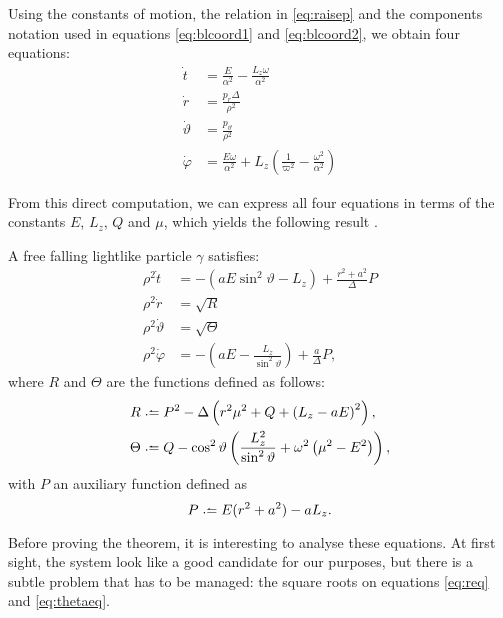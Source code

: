 Using the constants of motion, the relation in \autoref{eq:raisep} and the components notation used in equations \ref{eq:blcoord1} and  \ref{eq:blcoord2}, we obtain four equations:
\begin{align}
	\label{eq:initt}
	\dot{t} &= \frac{E}{\alpha^2} - \frac{L_z \omega}{\alpha^2} \\
	\label{eq:initr}
	\dot{r} &= \frac{p_r \Delta}{\rho^2} \\
	\label{eq:inittheta}
	\dot{\vartheta} &= \frac{p_\vartheta}{\rho^2} \\
	\label{eq:initphi}
	\dot{\varphi} &= \frac{E \omega}{\alpha^2} + L_z\left( \frac{1}{\varpi^2} - \frac{\omega^2}{\alpha^2} \right)
\end{align}

From this direct computation, we can express all four equations in terms of the constants $E$, $L_z$, $Q$ and $\mu$, which yields the following result \cite[p. 899]{thorne73}.

\begin{theorem}
	\label{theo:firsteqs}
	A free falling lightlike particle $\gamma$ satisfies:
	\begin{align}
		\label{eq:teq}
		\rho^2 \dot{t} &=-( aE\sin^2\vartheta - L_z) + \frac{r^2+a^2}{\Delta}P \\
		\label{eq:req}
		\rho^2 \dot{r} &= \sqrt{R} \\
		\label{eq:thetaeq}
		\rho^2 \dot{\vartheta} &= \sqrt{\Theta} \\
		\label{eq:phieq}
		\rho^2 \dot{\varphi} &=-( aE - \frac{L_z}{\sin^2\vartheta}) + \frac{a}{\Delta}P,
	\end{align}
	where $R$ and $\Theta$ are the functions defined as follows:
	\begin{align}
		\label{eq:defR}
		R &\defeq P^2 - \Delta \left( r^2\mu^2 + Q + \left(L_z - aE \right)^2 \right), \\
		\label{eq:defTheta}
		\Theta &\defeq Q - \cos^2\vartheta \left( \frac{L_z^2}{\sin^2\vartheta} + \omega^2\left(\mu^2 - E^2 \right)\right),
	\end{align}
	with $P$ an auxiliary function defined as
	\begin{equation}
		\label{eq:defP}
		P \defeq E(r^2 + a^2) - aL_z.
	\end{equation}
\end{theorem}

Before proving the theorem, it is interesting to analyse these equations. At first sight, the system look like a good candidate for our purposes, but there is a subtle problem that has to be managed: the square roots on equations \ref{eq:req} and \ref{eq:thetaeq}.

